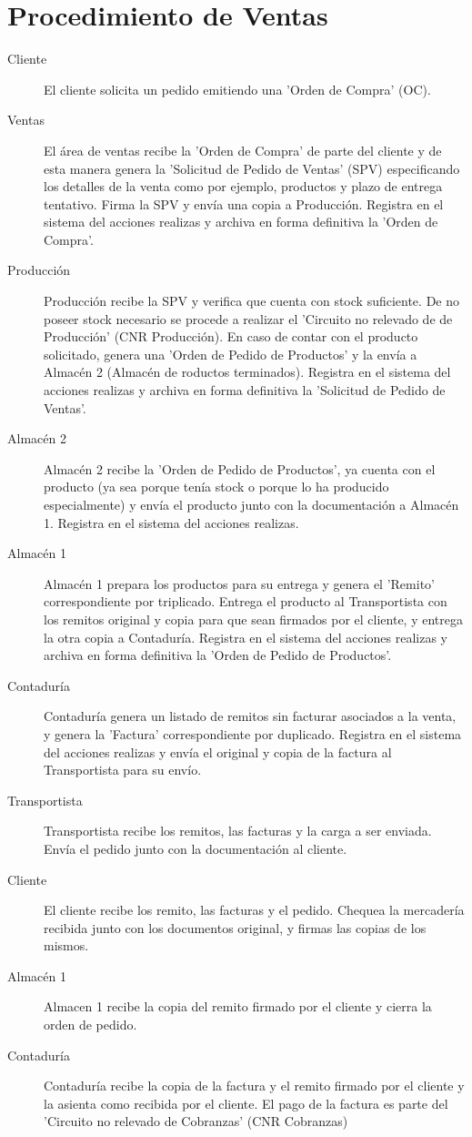 \section{Procedimiento de Ventas}
 \begin{description}
	\item[Cliente] El cliente solicita un pedido emitiendo una 'Orden de Compra' (OC).
	\item[Ventas] El área de ventas recibe la 'Orden de Compra' de parte del cliente y de esta manera genera la 'Solicitud de Pedido de Ventas' (SPV) especificando los detalles de la venta como por ejemplo, productos y plazo de entrega tentativo. Firma la SPV y envía una copia a Producción. Registra en el sistema del acciones realizas y archiva en forma definitiva la 'Orden de Compra'.
	\item[Producción] Producción recibe la SPV y verifica que cuenta con stock suficiente. De no poseer stock necesario se procede a realizar el 'Circuito no relevado de de Producción' (CNR Producción). En caso de contar con el producto solicitado, genera una 'Orden de Pedido de Productos' y la envía a Almacén 2 (Almacén de roductos terminados).  Registra en el sistema del acciones realizas y archiva en forma definitiva la 'Solicitud de Pedido de Ventas'. 
	\item[Almacén 2] Almacén 2 recibe la 'Orden de Pedido de Productos', ya cuenta con el producto (ya sea porque tenía stock o porque lo ha producido especialmente) y envía el producto junto con la documentación a Almacén 1. Registra en el sistema del acciones realizas.
	\item[Almacén 1] Almacén 1 prepara los productos para su entrega y genera el 'Remito' correspondiente por triplicado. Entrega el producto al Transportista con los remitos original y copia para que sean firmados por el cliente, y entrega la otra copia a Contaduría. Registra en el sistema del acciones realizas y archiva en forma definitiva la 'Orden de Pedido de Productos'.
	\item[Contaduría] Contaduría genera un listado de remitos sin facturar asociados a la venta, y genera la 'Factura' correspondiente por duplicado. Registra en el sistema del acciones realizas y envía el original y copia de la factura al Transportista para su envío.
	\item[Transportista] Transportista recibe los remitos, las facturas y la carga a ser enviada. Envía el pedido junto con la documentación al cliente. 
	\item[Cliente] El cliente recibe los remito, las facturas y el pedido. Chequea la mercadería recibida junto con los documentos original, y firmas las copias de los mismos.
	\item[Almacén 1] Almacen 1 recibe la copia del remito firmado por el cliente y cierra la orden de pedido. 
	\item[Contaduría] Contaduría recibe la copia de la factura y el remito firmado por el cliente y la asienta como recibida por el cliente. El pago de la factura es parte del 'Circuito no relevado de Cobranzas' (CNR Cobranzas)
\end{description}

